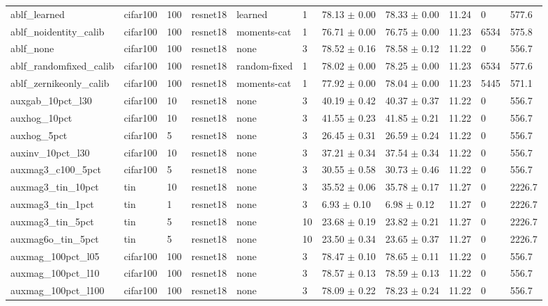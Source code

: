 \begin{tabular}{lllllllllll}
ablf_learned & cifar100 & 100 & resnet18 & learned & 1 & 78.13 $\pm$ 0.00 & 78.33 $\pm$ 0.00 & 11.24 & 0 & 577.6 \\
ablf_noidentity_calib & cifar100 & 100 & resnet18 & moments-cat & 1 & 76.71 $\pm$ 0.00 & 76.75 $\pm$ 0.00 & 11.23 & 6534 & 575.8 \\
ablf_none & cifar100 & 100 & resnet18 & none & 3 & 78.52 $\pm$ 0.16 & 78.58 $\pm$ 0.12 & 11.22 & 0 & 556.7 \\
ablf_randomfixed_calib & cifar100 & 100 & resnet18 & random-fixed & 1 & 78.02 $\pm$ 0.00 & 78.25 $\pm$ 0.00 & 11.23 & 6534 & 577.6 \\
ablf_zernikeonly_calib & cifar100 & 100 & resnet18 & moments-cat & 1 & 77.92 $\pm$ 0.00 & 78.04 $\pm$ 0.00 & 11.23 & 5445 & 571.1 \\
auxgab_10pct_l30 & cifar100 & 10 & resnet18 & none & 3 & 40.19 $\pm$ 0.42 & 40.37 $\pm$ 0.37 & 11.22 & 0 & 556.7 \\
auxhog_10pct & cifar100 & 10 & resnet18 & none & 3 & 41.55 $\pm$ 0.23 & 41.85 $\pm$ 0.21 & 11.22 & 0 & 556.7 \\
auxhog_5pct & cifar100 & 5 & resnet18 & none & 3 & 26.45 $\pm$ 0.31 & 26.59 $\pm$ 0.24 & 11.22 & 0 & 556.7 \\
auxinv_10pct_l30 & cifar100 & 10 & resnet18 & none & 3 & 37.21 $\pm$ 0.34 & 37.54 $\pm$ 0.34 & 11.22 & 0 & 556.7 \\
auxmag3_c100_5pct & cifar100 & 5 & resnet18 & none & 3 & 30.55 $\pm$ 0.58 & 30.73 $\pm$ 0.46 & 11.22 & 0 & 556.7 \\
auxmag3_tin_10pct & tin & 10 & resnet18 & none & 3 & 35.52 $\pm$ 0.06 & 35.78 $\pm$ 0.17 & 11.27 & 0 & 2226.7 \\
auxmag3_tin_1pct & tin & 1 & resnet18 & none & 3 & 6.93 $\pm$ 0.10 & 6.98 $\pm$ 0.12 & 11.27 & 0 & 2226.7 \\
auxmag3_tin_5pct & tin & 5 & resnet18 & none & 10 & 23.68 $\pm$ 0.19 & 23.82 $\pm$ 0.21 & 11.27 & 0 & 2226.7 \\
auxmag6o_tin_5pct & tin & 5 & resnet18 & none & 10 & 23.50 $\pm$ 0.34 & 23.65 $\pm$ 0.37 & 11.27 & 0 & 2226.7 \\
auxmag_100pct_l05 & cifar100 & 100 & resnet18 & none & 3 & 78.47 $\pm$ 0.10 & 78.65 $\pm$ 0.11 & 11.22 & 0 & 556.7 \\
auxmag_100pct_l10 & cifar100 & 100 & resnet18 & none & 3 & 78.57 $\pm$ 0.13 & 78.59 $\pm$ 0.13 & 11.22 & 0 & 556.7 \\
auxmag_100pct_l100 & cifar100 & 100 & resnet18 & none & 3 & 78.09 $\pm$ 0.22 & 78.23 $\pm$ 0.24 & 11.22 & 0 & 556.7 \\

\end{tabular}
